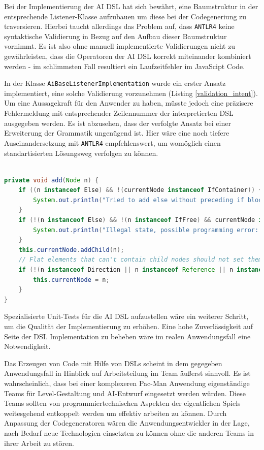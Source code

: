 \documentclass[conference]{IEEEtran}
\begin{document}
Bei der Implementierung der AI DSL hat sich bewährt, eine Baumstruktur in der entsprechende Listener-Klasse aufzubauen um diese bei der Codegeneriung zu traversieren. Hierbei taucht allerdings das Problem auf, dass \texttt{ANTLR4} keine syntaktische Validierung in Bezug auf den Aufbau dieser Baumstruktur vornimmt. Es ist also ohne manuell implementierte Validierungen nicht zu gewährleisten, dass die Operatoren der AI DSL korrekt miteinander kombiniert werden - im schlimmsten Fall resultiert ein Laufzeitfehler im JavaScipt Code.

In der Klasse \texttt{AiBaseListenerImplementation} wurde ein erster Ansatz implementiert, eine solche Validierung vorzunehmen (Listing \ref{validation_intent}). Um eine Aussagekraft für den Anwender zu haben, müsste jedoch eine präzisere Fehlermeldung mit entsprechender Zeilennummer der interpretierten DSL ausgegeben werden. Es ist abzusehen, dass der verfolgte Ansatz bei einer Erweiterung der Grammatik ungenügend ist. Hier wäre eine noch tiefere Auseinandersetzung mit \texttt{ANTLR4} empfehlenswert, um womöglich einen standartisierten Lösungsweg verfolgen zu können.

\begin{lstlisting}[language=Java, captionpos=b, caption=Grundliegende Validierung beim Hinzufügen eines einer Node in \texttt{AiBaseListenerImplementation}, label=validation_intent]

private void add(Node n) {
    if ((n instanceof Else) && !(currentNode instanceof IfContainer)) {
        System.out.println("Tried to add else without preceding if block");
    }
    if (!(n instanceof Else) && !(n instanceof IfFree) && currentNode instanceof IfContainer) {
        System.out.println("Illegal state, possible programming error: Opened an IfContainer and trying to add other than if or else block.");
    }
    this.currentNode.addChild(n);
    // Flat elements that can't contain child nodes should not set themselves as currentNode
    if (!(n instanceof Direction || n instanceof Reference || n instanceof Assignment)) {
        this.currentNode = n;
    }
}

\end{lstlisting}

Spezialisierte Unit-Tests für die AI DSL aufzustellen wäre ein weiterer Schritt, um die Qualität der Implementierung zu erhöhen. Eine hohe Zuverlässigkeit auf Seite der DSL Implementation zu beheben wäre im realen Anwendungsfall eine Notwendigkeit.

Das Erzeugen von Code mit Hilfe von DSLs scheint in dem gegegeben Anwendungsfall in Hinblick auf Arbeitsteilung im Team äußerst sinnvoll. Es ist wahrscheinlich, dass bei einer komplexeren Pac-Man Anwendung eigenständige Teams für Level-Gestaltung und AI-Entwurf eingesetzt werden würden. Diese Teams sollten von programmiertechnischen Aspekten der eigentlichen Spiels weitesgehend entkoppelt werden um effektiv arbeiten zu können. Durch Anpassung der Codegeneratoren wären die Anwendungsentwickler in der Lage, nach Bedarf neue Technologien einsetzten zu können ohne die anderen Teams in ihrer Arbeit zu stören.
\end{document}
